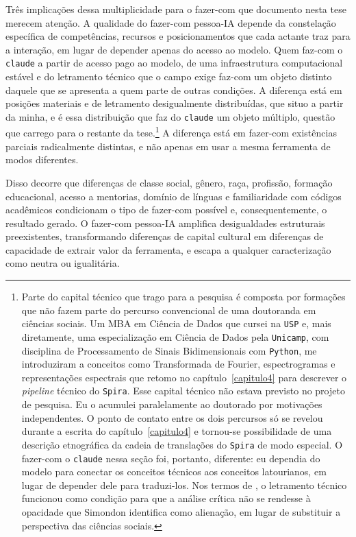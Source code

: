 Três implicações dessa multiplicidade para o fazer-com que documento nesta tese merecem atenção. A qualidade do fazer-com pessoa-IA depende da constelação específica de competências, recursos e posicionamentos que cada actante traz para a interação, em lugar de depender apenas do acesso ao modelo.
Quem faz-com o \texttt{claude} a partir de acesso pago ao modelo, de uma infraestrutura computacional estável e do letramento técnico que o campo exige faz-com um objeto distinto daquele que se apresenta a quem parte de outras condições. A diferença está em posições materiais e de letramento desigualmente distribuídas, que situo a partir da minha, e é essa distribuição que faz do \texttt{claude} um objeto múltiplo, questão que carrego para o restante da tese.\footnote{Parte do capital técnico que trago para a pesquisa é composta por formações que não fazem parte do percurso convencional de uma doutoranda em ciências sociais. Um MBA em Ciência de Dados que cursei na \texttt{USP} e, mais diretamente, uma especialização em Ciência de Dados pela \texttt{Unicamp}, com disciplina de Processamento de Sinais Bidimensionais com \texttt{Python}, me introduziram a conceitos como Transformada de Fourier, espectrogramas e representações espectrais que retomo no capítulo~\ref{capitulo4} para descrever o \textit{pipeline} técnico do \texttt{Spira}. Esse capital técnico não estava previsto no projeto de pesquisa. Eu o acumulei paralelamente ao doutorado por motivações independentes. O ponto de contato entre os dois percursos só se revelou durante a escrita do capítulo~\ref{capitulo4} e tornou-se possibilidade de uma descrição etnográfica da cadeia de translações do \texttt{Spira} de modo especial.
O fazer-com o \texttt{claude} nessa seção foi, portanto, diferente: eu dependia do modelo para conectar os conceitos técnicos aos conceitos latourianos, em lugar de depender dele para traduzi-los. Nos termos de \textcite{Vicentin_2022_Esboco}, o letramento técnico funcionou como condição para que a análise crítica não se rendesse à opacidade que Simondon identifica como alienação, em lugar de substituir a perspectiva das ciências sociais.} A diferença está em fazer-com existências parciais radicalmente distintas, e não apenas em usar a mesma ferramenta de modos diferentes.

Disso decorre que diferenças de classe social, gênero, raça, profissão, formação educacional, acesso a mentorias, domínio de línguas e familiaridade com códigos acadêmicos condicionam o tipo de fazer-com possível e, consequentemente, o resultado gerado. O fazer-com pessoa-IA amplifica desigualdades estruturais preexistentes, transformando diferenças de capital cultural em diferenças de capacidade de extrair valor da ferramenta, e escapa a qualquer caracterização como neutra ou igualitária.

